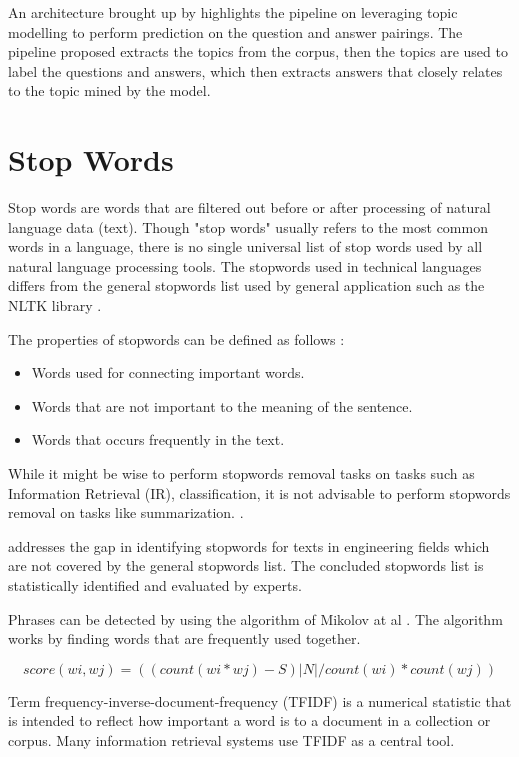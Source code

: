 An architecture brought up by \cite{6227139} highlights the pipeline on leveraging topic modelling to perform prediction on the question and answer pairings. The pipeline proposed extracts the topics from the corpus, then the topics are used to label the questions and answers, which then extracts answers that closely relates to the topic mined by the model.

\pagebreak

\section{Stop Words}
Stop words are words that are filtered out before or after processing of natural language data (text). Though "stop words" usually refers to the most common words in a language, there is no single universal list of stop words used by all natural language processing tools. The stopwords used in technical languages differs from the general stopwords list used by general application such as the NLTK library \cite{stopwords_1} \cite{stopwords_2}.

The properties of stopwords can be defined as follows \cite{9074166}:
  \begin{itemize}
    \item Words used for connecting important words.
    \item Words that are not important to the meaning of the sentence.
    \item  Words that occurs frequently in the text.
  \end{itemize}


While it might be wise to perform stopwords removal tasks on tasks such as Information Retrieval (IR), classification, it is not advisable to perform stopwords removal on tasks like summarization. \cite{9074166}.

\cite{stopwords_1} addresses the gap in identifying stopwords for texts in engineering fields which are not covered by the general stopwords list. The concluded stopwords list is statistically identified and evaluated by experts. 

Phrases can be detected by using the algorithm of Mikolov at al \cite{NIPS2013_9aa42b31}. The algorithm works by finding words that are frequently used together.

\[ score(wi, wj) = ((count(wi*wj) - S)|N| / count(wi) * count(wj)) \]

Term frequency-inverse-document-frequency (TFIDF) is a numerical statistic that is intended to reflect how important a word is to a document in a collection or corpus. Many information retrieval systems use TFIDF as a central tool.

